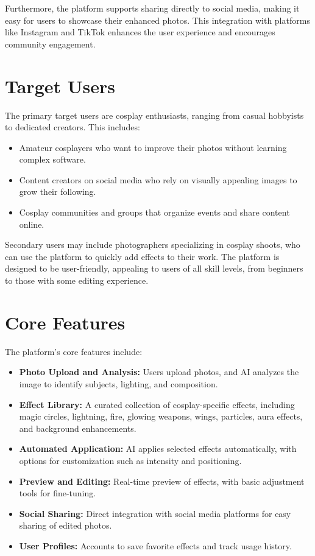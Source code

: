 \documentclass[12pt]{article}
\begin{document}
Furthermore, the platform supports sharing directly to social media, making it easy for users to showcase their enhanced photos. This integration with platforms like Instagram and TikTok enhances the user experience and encourages community engagement.

\section{Target Users}

The primary target users are cosplay enthusiasts, ranging from casual hobbyists to dedicated creators. This includes:

\begin{itemize}
    \item Amateur cosplayers who want to improve their photos without learning complex software.
    \item Content creators on social media who rely on visually appealing images to grow their following.
    \item Cosplay communities and groups that organize events and share content online.
\end{itemize}

Secondary users may include photographers specializing in cosplay shoots, who can use the platform to quickly add effects to their work. The platform is designed to be user-friendly, appealing to users of all skill levels, from beginners to those with some editing experience.

\section{Core Features}

The platform's core features include:

\begin{itemize}
    \item \textbf{Photo Upload and Analysis:} Users upload photos, and AI analyzes the image to identify subjects, lighting, and composition.
    \item \textbf{Effect Library:} A curated collection of cosplay-specific effects, including magic circles, lightning, fire, glowing weapons, wings, particles, aura effects, and background enhancements.
    \item \textbf{Automated Application:} AI applies selected effects automatically, with options for customization such as intensity and positioning.
    \item \textbf{Preview and Editing:} Real-time preview of effects, with basic adjustment tools for fine-tuning.
    \item \textbf{Social Sharing:} Direct integration with social media platforms for easy sharing of edited photos.
    \item \textbf{User Profiles:} Accounts to save favorite effects and track usage history.
\end{itemize}
\end{document}
